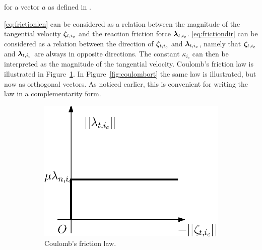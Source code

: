 \documentclass[../DC2017114Bouma.tex]{subfiles}
\begin{document}
for a vector $a$ as defined in \cite{Studer2006}.

\eqref{eq:frictionlen} can be considered as a relation between the magnitude of the tangential velocity $\boldsymbol{\zeta}_{t,i_c}$ and the reaction friction force $\boldsymbol{\lambda}_{t,i_c}$. \eqref{eq:frictiondir} can be considered as a relation between the direction of $\boldsymbol{\zeta}_{t,i_c}$ and $\boldsymbol{\lambda}_{t,i_c}$, namely that $\boldsymbol{\zeta}_{t,i_c}$ and $\boldsymbol{\lambda}_{t,i_c}$ are always in opposite directions. The constant $\kappa_{i_c}$ can then be interpreted as the magnitude of the tangential velocity. Coulomb's friction law is illustrated in Figure~\ref{fig:coulombfriction}. In Figure~\ref{fig:coulombort} the same law is illustrated, but now as orthogonal vectors. As noticed earlier, this is convenient for writing the law in a complementarity form.

\begin{figure}[h]
\centering
\begin{subfigure}{0.38\textwidth}
\centering
\includegraphics[width=\linewidth]{coulombfriction.eps}\caption{Coulomb's friction law.}\vspace{1.25cm}\label{fig:coulombfriction}
\end{subfigure}
\qquad
\begin{subfigure}{0.3\textwidth}
\centering

\end{subfigure}
\end{figure}
\end{document}
